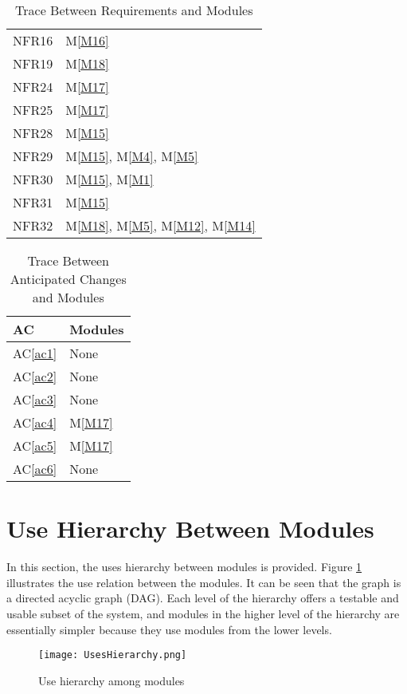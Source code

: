 \documentclass[12pt, titlepage]{article}
\newcommand{\acref}[1]{AC\ref{#1}}
\newcommand{\mref}[1]{M\ref{#1}}
\begin{document}
\begin{table}[htbp]
\begin{tabular}{p{} p{}}
NFR16 & \mref{M16}\\
NFR19 & \mref{M18}\\
NFR24 & \mref{M17}\\
NFR25 & \mref{M17}\\
NFR28 & \mref{M15}\\
NFR29 & \mref{M15}, \mref{M4}, \mref{M5}\\
NFR30 & \mref{M15}, \mref{M1}\\
NFR31 & \mref{M15}\\
NFR32 & \mref{M18}, \mref{M5}, \mref{M12}, \mref{M14}\\
\bottomrule
\end{tabular}
\caption{Trace Between Requirements and Modules}
\label{TblRT}
\end{table}

\begin{table}[htbp]
\centering
\begin{tabular}{p{} p{}}
\toprule
\textbf{AC} & \textbf{Modules}\\
\midrule
\acref{ac1} & None\\
\acref{ac2} & None\\
\acref{ac3} & None\\
\acref{ac4} & \mref{M17}\\
\acref{ac5} & \mref{M17}\\
\acref{ac6} & None\\
\bottomrule
\end{tabular}
\caption{Trace Between Anticipated Changes and Modules}
\label{TblACT}
\end{table}

\newpage
\section{Use Hierarchy Between Modules} \label{SecUse}

In this section, the uses hierarchy between modules is
provided. Figure \ref{FigUH} illustrates the use relation between
the modules. It can be seen that the graph is a directed acyclic graph
(DAG). Each level of the hierarchy offers a testable and usable subset of the
system, and modules in the higher level of the hierarchy are essentially simpler
because they use modules from the lower levels.\\


\begin{figure}[htbp]
\centering
\texttt{[image: UsesHierarchy.png]}
\caption{Use hierarchy among modules}
\label{FigUH}
\end{figure}
\end{document}
